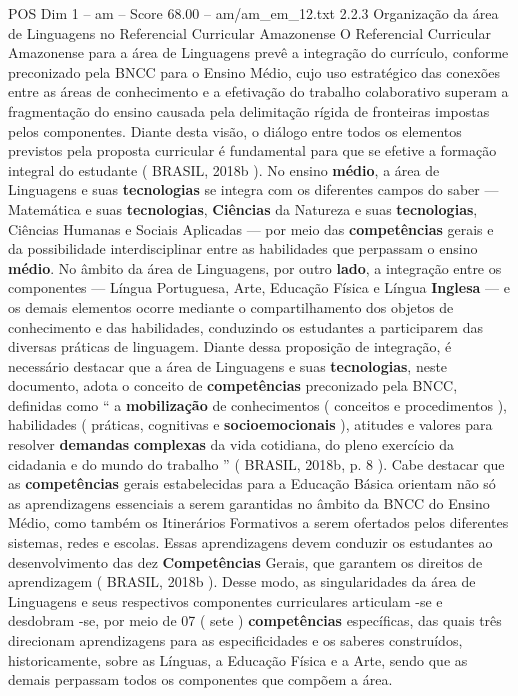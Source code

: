 \begin{textsample}{POS Dim 1 – am – Score 68.00 – am/am\_em\_12.txt}  \label{ex:f1_pos_221}
2.2.3 Organização da área de Linguagens no Referencial Curricular Amazonense O Referencial Curricular Amazonense para a área de Linguagens prevê a integração do currículo, conforme preconizado pela BNCC para o Ensino Médio, cujo uso estratégico das conexões entre as áreas de conhecimento e a efetivação do trabalho colaborativo superam a fragmentação do ensino causada pela delimitação rígida de fronteiras impostas pelos componentes.
Diante desta visão, o diálogo entre todos os elementos previstos pela proposta curricular é fundamental para que se efetive a formação integral do estudante ( BRASIL, 2018b ).
No ensino \textbf{médio}, a área de Linguagens e suas \textbf{tecnologias} se integra com os diferentes campos do saber — Matemática e suas \textbf{tecnologias}, \textbf{Ciências} da Natureza e suas \textbf{tecnologias}, Ciências Humanas e Sociais Aplicadas — por meio das \textbf{competências} gerais e da possibilidade interdisciplinar entre as habilidades que perpassam o ensino \textbf{médio}.
No âmbito da área de Linguagens, por outro \textbf{lado}, a integração entre os componentes — Língua Portuguesa, Arte, Educação Física e Língua \textbf{Inglesa} — e os demais elementos ocorre mediante o compartilhamento dos objetos de conhecimento e das habilidades, conduzindo os estudantes a participarem das diversas práticas de linguagem.
Diante dessa proposição de integração, é necessário destacar que a área de Linguagens e suas \textbf{tecnologias}, neste documento, adota o conceito de \textbf{competências} preconizado pela BNCC, definidas como “ a \textbf{mobilização} de conhecimentos ( conceitos e procedimentos ), habilidades ( práticas, cognitivas e \textbf{socioemocionais} ), atitudes e valores para resolver \textbf{demandas} \textbf{complexas} da vida cotidiana, do pleno exercício da cidadania e do mundo do trabalho ” ( BRASIL, 2018b, p. 8 ).
Cabe destacar que as \textbf{competências} gerais estabelecidas para a Educação Básica orientam não só as aprendizagens essenciais a serem garantidas no âmbito da BNCC do Ensino Médio, como também os Itinerários Formativos a serem ofertados pelos diferentes sistemas, redes e escolas.
Essas aprendizagens devem conduzir os estudantes ao desenvolvimento das dez \textbf{Competências} Gerais, que garantem os direitos de aprendizagem ( BRASIL, 2018b ).
Desse modo, as singularidades da área de Linguagens e seus respectivos componentes curriculares articulam -se e desdobram -se, por meio de 07 ( sete ) \textbf{competências} específicas, das quais três direcionam aprendizagens para as especificidades e os saberes construídos, historicamente, sobre as Línguas, a Educação Física e a Arte, sendo que as demais perpassam todos os componentes que compõem a área.

\end{textsample}
